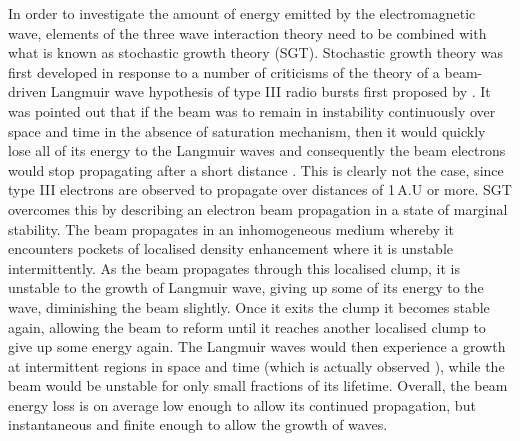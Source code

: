 In order to investigate the amount of energy emitted by the electromagnetic wave, elements of the three wave interaction theory need to be combined with what is known as stochastic growth theory \citep{robinson1993a}(SGT). Stochastic growth theory was first developed in response to a number of criticisms of the theory of a beam-driven Langmuir wave hypothesis of type III radio bursts first proposed by \citet{ginzburg1958}. It was pointed out that if the beam was to remain in instability continuously over space and time in the absence of saturation mechanism, then it would quickly lose all of its energy to the Langmuir waves and consequently the beam electrons would stop propagating after a short distance \citep{sturrock1964}. This is clearly not the case, since type III electrons are observed to propagate over distances of 1\,A.U or more. 
SGT overcomes this by describing an electron beam propagation in a state of marginal stability. The beam propagates in an inhomogeneous medium whereby it encounters pockets of localised density enhancement where it is unstable intermittently. As the beam propagates through this localised clump, it is unstable to the growth of Langmuir wave, giving up some of its energy to the wave, diminishing the beam slightly. Once it exits the clump it becomes stable again, allowing the beam to reform until it reaches another localised clump to give up some energy again. The Langmuir waves would then experience a growth at intermittent regions in space and time (which is actually observed \citep{lin1986}), while the beam would be unstable for only small fractions of its lifetime. Overall, the beam energy loss is on average low enough to allow its continued propagation, but instantaneous and finite enough to allow the growth of waves. 
